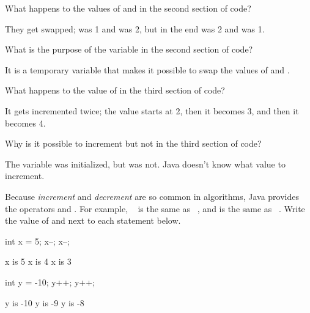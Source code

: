 \Q What happens to the values of  and  in the second section of code?

\begin{answer}
They get swapped;  was 1 and  was 2, but in the end  was 2 and  was 1.
\end{answer}


\Q What is the purpose of the variable  in the second section of code?

\begin{answer}
It is a temporary variable that makes it possible to swap the values of  and .
\end{answer}


\Q What happens to the value of  in the third section of code?

\begin{answer}
It gets incremented twice; the value starts at 2, then it becomes 3, and then it becomes 4.
\end{answer}


\Q Why is it possible to increment  but not  in the third section of code?

\begin{answer}
The variable  was initialized, but  was not.
Java doesn't know what value to increment.
\end{answer}


\Q Because \emph{increment} and \emph{decrement} are so common in algorithms, Java provides the operators \java{++} and \java{--}.
For example, ~ is the same as ~, and  is the same as ~.
Write the value of  and  next to each statement below.

\vspace{-1ex}
\hspace{2em}
\begin{minipage}[t]{100pt}
\begin{javalst}
int x = 5;
x--;
x--;
\end{javalst}
\end{minipage}
\begin{minipage}[t]{100pt}
\begin{answer}
\begin{javaans}
x is 5
x is 4
x is 3
\end{javaans}
\end{answer}
\end{minipage}
\begin{minipage}[t]{100pt}
\begin{javalst}
int y = -10;
y++;
y++;
\end{javalst}
\end{minipage}
\begin{minipage}[t]{100pt}
\begin{answer}
\begin{javaans}
y is -10
y is -9
y is -8
\end{javaans}
\end{answer}
\end{minipage}
\vspace{2pt}


